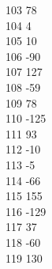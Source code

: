 { 103	78 \\
 104	4 \\
 105	10 \\
 106	-90 \\
 107	127 \\
 108	-59 \\
 109	78 \\
 110	-125 \\
 111	93 \\
 112	-10 \\
 113	-5 \\
 114	-66 \\
 115	155 \\
 116	-129 \\
 117	37 \\
 118	-60 \\
 119	130 \\
}
